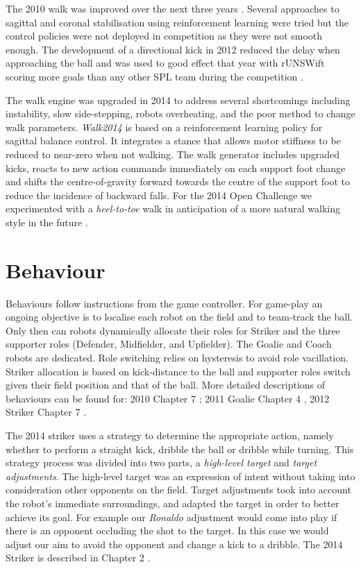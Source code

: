 \documentclass[runningheads,a4paper]{llncs}
\begin{document}
The 2010 walk was improved over the next three years \cite{white2011humanoid}  \cite{lui2013bipedal}. Several approaches to sagittal and coronal stabilisation using reinforcement learning were tried \cite{hengst2011learning} \cite{lange2011cycloid} \cite{hengst2013bipedallateralRL} but the control policies were not deployed in competition as they were not smooth enough. The development of a directional kick in 2012 reduced the delay when approaching the ball and was used to good effect that year with rUNSWift scoring more goals than any other SPL team during the competition \cite{teh2012kicks}.

The walk engine was upgraded in 2014 to address several shortcomings including instability, slow side-stepping, robots overheating, and the poor method to change walk parameters. \emph{Walk2014} \cite{hengst2014walk} is based on a reinforcement learning policy for sagittal balance control. It integrates a stance that allows motor stiffness to be reduced to near-zero when not walking. The walk generator includes upgraded kicks, reacts to new action commands immediately on each support foot change and shifts the centre-of-gravity forward towards the centre of the support foot to reduce the incidence of backward falls. For the 2014 Open Challenge we experimented with a \emph{heel-to-toe} walk in anticipation of a more natural walking style in the future \cite{tsekouras2014heel}.





\section{Behaviour}

Behaviours follow instructions from the game controller. For game-play an ongoing objective is to localise each robot on the field and to team-track the ball. Only then can robots dynamically allocate their roles for Striker and the three supporter roles (Defender, Midfielder, and Upfielder). The Goalie and Coach robots are dedicated. Role switching relies on hysteresis to avoid role vacillation. Striker allocation is based on kick-distance to the ball and supporter roles switch given their field position and that of the ball. More detailed descriptions of behaviours can be found for: 2010 Chapter 7 \cite{cse10rUNSWift2010}; 2011 Goalie Chapter 4 \cite{teh2011ballmodelling}, 2012 Striker Chapter 7 \cite{teh2012kicks}. 

The 2014 striker uses a strategy to determine the appropriate action, namely whether to perform a straight kick, dribble the ball or dribble while turning. This strategy process was divided into two parts, a \emph{high-level target} and \emph{target adjustments}. The high-level target was an expression of intent without taking into consideration other opponents on the field. Target adjustments took into account the robot's immediate surroundings, and adapted the target in order to better achieve its goal. For example our \emph{Ronaldo} adjustment would come into play if there is an opponent occluding the shot to the target. In this case we would adjust our aim to avoid the opponent and change a kick to a dribble. The 2014 Striker is described in Chapter 2 \cite{tsekouras2014heel}.
\end{document}
